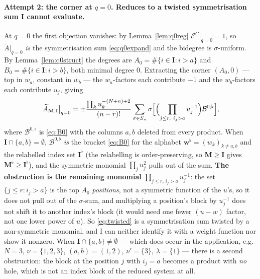 \documentclass[11pt]{article}
\theoremstyle{plain}
\theoremstyle{definition}
\theoremstyle{remark}
\theoremstyle{plain}
\newcommand{\bI}{\mathbf{I}}
\newcommand{\bM}{\mathbf{M}}
\newcommand{\bw}{\mathbf{w}}
\newcommand{\At}{\widetilde{A}}
\begin{document}
\paragraph{Attempt 2: the corner at $q=0$.  Reduces to a twisted symmetrisation
sum I cannot evaluate.}
At $q=0$ the first objection vanishes: by Lemma~\ref{lem:q0reg}
$\mathcal{E}^C|_{q=0}=1$, so $\At|_{q=0}$ \emph{is} the symmetrisation sum
\eqref{eq:q0expand} and the bidegree is $\sigma$-uniform.  By
Lemma~\ref{lem:q0struct} the degrees are
$A_0=\#\{i\in\bI:i>a\}$ and $B_0=\#\{i\in\bI:i>b\}$, both minimal degree $0$.
Extracting the corner $(A_0,0)$ --- top in $w_a$, constant in $w_b$ --- the
$w_a$-factors each contribute $-1$ and the $w_b$-factors each contribute $u_j$,
giving
\begin{equation}
[w_a^{A_0}w_b^{0}]\,\At_{\bM,\bI}\big|_{q=0}
=\pm\frac{\prod_ku_k^{-(N+n)+2}}{(n-r)!}
 \sum_{\sigma\in S_n}\sigma\Bigl[
 \Bigl(\prod_{j\le r,\ i_j>a}u_j^{-1}\Bigr)\mathcal{B}^{0,\flat}\Bigr],
\label{eq:twisted}
\end{equation}
where $\mathcal{B}^{0,\flat}$ is \eqref{eq:B0} with the columns $a,b$ deleted
from every product.  When $\bI\cap\{a,b\}=\emptyset$, $\mathcal{B}^{0,\flat}$
\emph{is} the bracket \eqref{eq:B0} for the alphabet $\bw^\flat=(w_k)_{k\ne a,b}$
and the relabelled index set $\bI^\flat$ (the relabelling is order-preserving,
so $\bM\ge\bI$ gives $\bM^\flat\ge\bI^\flat$), and the symmetric monomial
$\prod_ju_j^2$ pulls out of the sum.  \textbf{The obstruction is the remaining
monomial} $\prod_{j\le r,\,i_j>a}u_j^{-1}$: the set $\{j\le r:i_j>a\}$ is the
top $A_0$ \emph{positions}, not a symmetric function of the $u$'s, so it does not
pull out of the $\sigma$-sum, and multiplying a position's block by $u_j^{-1}$
does not shift it to another index's block (it would need one fewer
$(u-w)$ factor, not one lower power of $u$).  So \eqref{eq:twisted} is a
symmetrisation sum twisted by a non-symmetric monomial, and I can neither
identify it with a weight function nor show it nonzero.  When
$\bI\cap\{a,b\}\neq\emptyset$ --- which does occur in the application, e.g.\
$N=3$, $\nu=\{1,2,3\}$, $(a,b)=(1,2)$, $\nu'=\{3\}$, $\lambda=\{1\}$ --- there is
a second obstruction: the block at the position $j$ with $i_j=a$ becomes a
product with \emph{no} hole, which is not an index block of the reduced system
at all.
\end{document}
